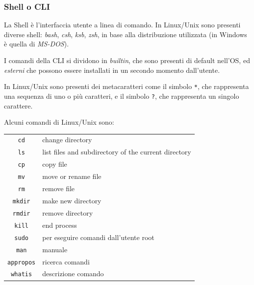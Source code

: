 \documentclass[a4paper]{article}
\begin{document}
\subsubsection*{Shell o CLI}
La Shell è l'interfaccia utente a linea di comando. In Linux/Unix sono presenti diverse shell: \textit{bash}, \textit{csh},
\textit{ksb}, \textit{zsh}, in base alla distribuzione utilizzata (in Windows è quella di \textit{MS-DOS}).

I comandi della CLI si dividono in \textit{builtin}, che sono presenti di default nell'OS, ed \textit{esterni} che possono
essere installati in un secondo momento dall'utente.

In Linux/Unix sono presenti dei metacaratteri come il simbolo \verb|*|, che rappresenta una sequenza di uno o più caratteri,
e il simbolo \verb|?|, che rappresenta un singolo carattere.

Alcuni comandi di Linux/Unix sono:
\begin{center}
	\begin{tabularx}{\textwidth}{c X}
		\verb|cd| & change directory \\
		\verb|ls| & list files and subdirectory of the current directory \\
		\verb|cp| & copy file \\
		\verb|mv| & move or rename file \\
		\verb|rm| & remove file\\
		\verb|mkdir| & make new directory \\
		\verb|rmdir| & remove directory \\
		\verb|kill| & end process \\
		\verb|sudo| & per eseguire comandi dall'utente root \\
		\verb|man| & manuale \\
		\verb|appropos| & ricerca comandi \\
		\verb|whatis| & descrizione comando
	\end{tabularx}
\end{center}

\newpage


\end{document}
